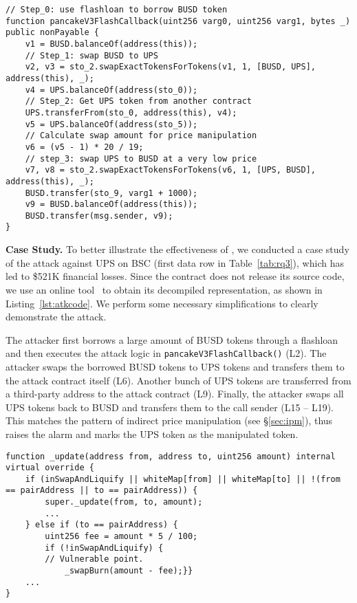 \begin{lstlisting}[caption={Attack contract against UPS.}, label=lst:atkcode]
// Step_0: use flashloan to borrow BUSD token
function pancakeV3FlashCallback(uint256 varg0, uint256 varg1, bytes _) public nonPayable {
    v1 = BUSD.balanceOf(address(this));
    // Step_1: swap BUSD to UPS
    v2, v3 = sto_2.swapExactTokensForTokens(v1, 1, [BUSD, UPS], address(this), _);
    v4 = UPS.balanceOf(address(sto_0));
    // Step_2: Get UPS token from another contract
    UPS.transferFrom(sto_0, address(this), v4);
    v5 = UPS.balanceOf(address(sto_5)); 
    // Calculate swap amount for price manipulation
    v6 = (v5 - 1) * 20 / 19;
    // step_3: swap UPS to BUSD at a very low price
    v7, v8 = sto_2.swapExactTokensForTokens(v6, 1, [UPS, BUSD], address(this), _);
    BUSD.transfer(sto_9, varg1 + 1000);
    v9 = BUSD.balanceOf(address(this));
    BUSD.transfer(msg.sender, v9);
}
\end{lstlisting}

\noindent
\textbf{Case Study.}
To better illustrate the effectiveness of {\tool}, we conducted a case study of the attack against UPS on BSC (first data row in Table~\ref{tab:rq3}), which has led to \$521K financial losses.
Since the contract does not release its source code, we use an online tool~\cite{dedaub} to obtain its decompiled representation, as shown in Listing~\ref{lst:atkcode}. We perform some necessary simplifications to clearly demonstrate the attack. 



The attacker first borrows a large amount of BUSD tokens through a flashloan and then executes the attack logic in \texttt{pancakeV3FlashCallback()} (L2). The attacker swaps the borrowed BUSD tokens to UPS tokens and transfers them to the attack contract itself (L6). Another bunch of UPS tokens are transferred from a third-party address to the attack contract (L9). Finally, the attacker swaps all UPS tokens back to BUSD and transfers them to the call sender (L15 -- L19). This matches the pattern of indirect price manipulation (see \S\ref{sec:ipm}), thus {\tool} raises the alarm and marks the UPS token as the manipulated token.

\begin{lstlisting}[caption={Vulnerable \texttt{\_update()} in UPS.}, label=lst:vulcode]
function _update(address from, address to, uint256 amount) internal virtual override {
    if (inSwapAndLiquify || whiteMap[from] || whiteMap[to] || !(from == pairAddress || to == pairAddress)) {
        super._update(from, to, amount);
        ...
    } else if (to == pairAddress) {
        uint256 fee = amount * 5 / 100;
        if (!inSwapAndLiquify) {
        // Vulnerable point.
            _swapBurn(amount - fee);}}
    ...
}
\end{lstlisting}


